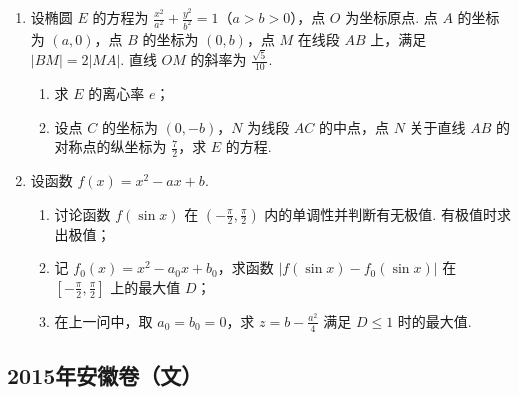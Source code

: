 \begin{description}
\begin{enumerate}[leftmargin=5pt]
        \item 设椭圆 \(E\) 的方程为 \(\frac{x^2}{a^2} + \frac{y^2}{b^2} = 1\)（\(a > b > 0\)），点 \(O\) 为坐标原点. 点 \(A\) 的坐标为 \((a, 0)\)，点 \(B\) 的坐标为 \((0, b)\)，点 \(M\) 在线段 \(AB\) 上，满足 \(|BM| = 2|MA|\). 直线 \(OM\) 的斜率为 \(\frac{\sqrt{5}}{10}\).

\begin{enumerate}
\item 求 \(E\) 的离心率 \(e\)；
\item 设点 \(C\) 的坐标为 \((0, -b)\)，\(N\) 为线段 \(AC\) 的中点，点 \(N\) 关于直线 \(AB\) 的对称点的纵坐标为 \(\frac{7}{2}\)，求 \(E\) 的方程.
\end{enumerate}

        \item 设函数 \( f(x) = x^{2} - ax + b \).

\begin{enumerate}
\item 讨论函数 \( f(\sin x) \) 在 \( \left(-\frac{\pi}{2}, \frac{\pi}{2}\right) \) 内的单调性并判断有无极值. 有极值时求出极值；
\item 记 \( f_{0}(x) = x^{2} - a_{0}x + b_{0} \)，求函数 \( |f(\sin x) - f_{0}(\sin x)| \) 在 \( \left[-\frac{\pi}{2}, \frac{\pi}{2}\right] \) 上的最大值 \(D\)；
\item 在上一问中，取 \(a_0 = b_0 = 0\)，求 \(z = b - \frac{a^2}{4}\) 满足 \(D \leqslant 1\) 时的最大值.
\end{enumerate}

    \end{enumerate}

\end{description}


\subsection{2015年安徽卷（文）}\label{gk:2015年安徽卷（文）}

